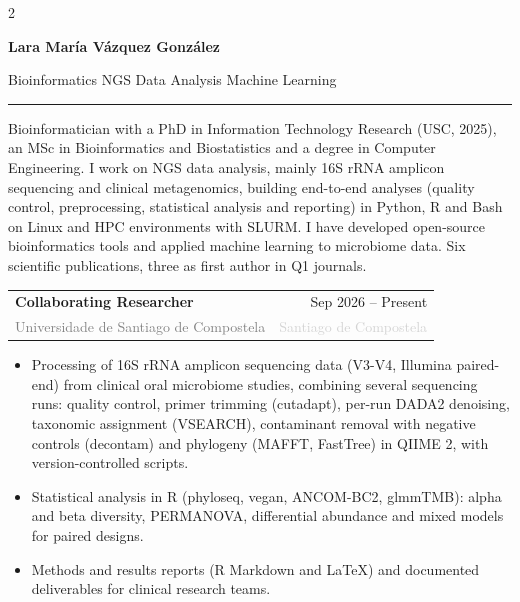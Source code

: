 \documentclass[10pt, a4paper]{article}
\makeatletter
\newcommand{\mainsection}[1]{%
  \vspace{9pt}{\large\bfseries\color{accent}#1}\par
  \vspace{2pt}{\color{rulegray}\hrule}\vspace{5pt}}
\newcommand{\cventry}[4]{%
  \begin{tabularx}{\linewidth}{@{}Xr@{}}
    \textbf{#1} & \textcolor{lightaccent}{\small #3} \\
    \textcolor{gray}{#2} & \textcolor{lightgray}{\small #4}
  \end{tabularx}\par\vspace{1pt}}
\makeatother
\begin{document}
\begin{paracol}{2}
\switchcolumn
\justifying

{\fontsize{24}{28}\selectfont\bfseries\color{accent} Lara Mar\'ia V\'azquez Gonz\'alez}\par
\vspace{5pt}
{\large\color{gray} Bioinformatics \textperiodcentered{} NGS Data Analysis \textperiodcentered{} Machine Learning}\par
\vspace{6pt}
{\color{accent}\rule{\linewidth}{1.5pt}}\par

\mainsection{Profile}
Bioinformatician with a PhD in Information Technology Research (USC, 2025), an MSc in Bioinformatics and Biostatistics and a degree in Computer Engineering. I work on NGS data analysis, mainly 16S rRNA amplicon sequencing and clinical metagenomics, building end-to-end analyses (quality control, preprocessing, statistical analysis and reporting) in Python, R and Bash on Linux and HPC environments with SLURM. I have developed open-source bioinformatics tools and applied machine learning to microbiome data. Six scientific publications, three as first author in Q1 journals.

\mainsection{Experience}

\cventry{Collaborating Researcher}{Universidade de Santiago de Compostela}{Sep 2026 -- Present}{Santiago de Compostela}
\begin{itemize}
  \item Processing of 16S rRNA amplicon sequencing data (V3-V4, Illumina paired-end) from clinical oral microbiome studies, combining several sequencing runs: quality control, primer trimming (cutadapt), per-run DADA2 denoising, taxonomic assignment (VSEARCH), contaminant removal with negative controls (decontam) and phylogeny (MAFFT, FastTree) in QIIME 2, with version-controlled scripts.
  \item Statistical analysis in R (phyloseq, vegan, ANCOM-BC2, glmmTMB): alpha and beta diversity, PERMANOVA, differential abundance and mixed models for paired designs.
  \item Methods and results reports (R Markdown and LaTeX) and documented deliverables for clinical research teams.
\end{itemize}
\vspace{6pt}


\end{paracol}
\end{document}
